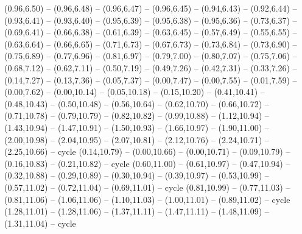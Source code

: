 {(0.96,6.50) -- (0.96,6.48) -- (0.96,6.47) -- (0.96,6.45) -- (0.94,6.43) -- (0.92,6.44) -- (0.93,6.41) -- (0.93,6.40) -- (0.95,6.39) -- (0.95,6.38) -- (0.95,6.36) -- (0.73,6.37) -- (0.69,6.41) -- (0.66,6.38) -- (0.61,6.39) -- (0.63,6.45) -- (0.57,6.49) -- (0.55,6.55) -- (0.63,6.64) -- (0.66,6.65) -- (0.71,6.73) -- (0.67,6.73) -- (0.73,6.84) -- (0.73,6.90) -- (0.75,6.89) -- (0.77,6.96) -- (0.81,6.97) -- (0.79,7.00) -- (0.80,7.07) -- (0.75,7.06) -- (0.68,7.12) -- (0.62,7.11) -- (0.50,7.19) -- (0.49,7.26) -- (0.42,7.31) -- (0.33,7.26) -- (0.14,7.27) -- (0.13,7.36) -- (0.05,7.37) -- (0.00,7.47) -- (0.00,7.55) -- (0.01,7.59) -- (0.00,7.62) -- (0.00,10.14) -- (0.05,10.18) -- (0.15,10.20) -- (0.41,10.41) -- (0.48,10.43) -- (0.50,10.48) -- (0.56,10.64) -- (0.62,10.70) -- (0.66,10.72) -- (0.71,10.78) -- (0.79,10.79) -- (0.82,10.82) -- (0.99,10.88) -- (1.12,10.94) -- (1.43,10.94) -- (1.47,10.91) -- (1.50,10.93) -- (1.66,10.97) -- (1.90,11.00) -- (2.00,10.98) -- (2.04,10.95) -- (2.07,10.81) -- (2.12,10.76) -- (2.24,10.71) -- (2.25,10.66) -- cycle
  (0.14,10.79) -- (0.00,10.66) -- (0.00,10.71) -- (0.09,10.79) -- (0.16,10.83) -- (0.21,10.82) -- cycle
  (0.60,11.00) -- (0.61,10.97) -- (0.47,10.94) -- (0.32,10.88) -- (0.29,10.89) -- (0.30,10.94) -- (0.39,10.97) -- (0.53,10.99) -- (0.57,11.02) -- (0.72,11.04) -- (0.69,11.01) -- cycle
  (0.81,10.99) -- (0.77,11.03) -- (0.81,11.06) -- (1.06,11.06) -- (1.10,11.03) -- (1.00,11.01) -- (0.89,11.02) -- cycle
  (1.28,11.01) -- (1.28,11.06) -- (1.37,11.11) -- (1.47,11.11) -- (1.48,11.09) -- (1.31,11.04) -- cycle}
